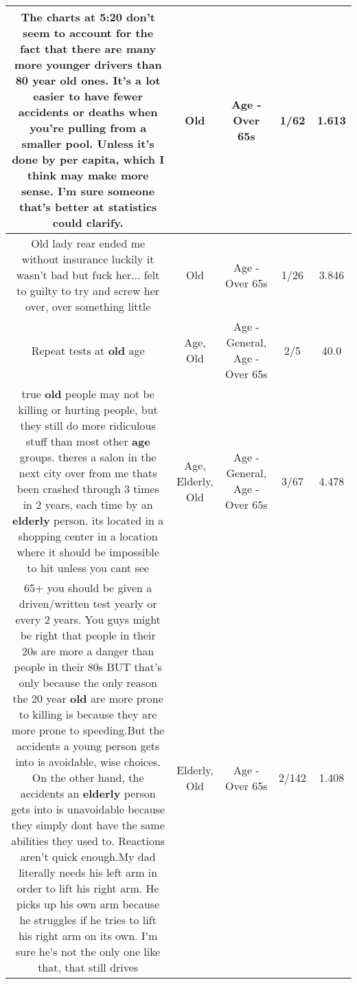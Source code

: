 \documentclass[11pt]{article}
\newlength\mylength
\begin{document}
\begin{center}
\begin{longtable}{|C{.65\mylength}|C{.30\mylength}|C{.12\mylength}|C{.12\mylength}|C{.12\mylength}|}
  \small The charts at 5:20 don't seem to account for the fact that there are many more younger drivers than 80 year \textbf{old} ones. It's a lot easier to have fewer accidents or deaths when you're pulling from a smaller pool. Unless it's done by per capita, which I think may make more sense. I'm sure someone that's better at statistics could clarify.\normalsize   & Old & Age - Over 65s & 1/62 & 1.613 \\  \hline
  \small Old lady rear ended me without insurance luckily it wasn't bad but fuck her... felt to guilty to try and screw her over, over something little\normalsize   & Old & Age - Over 65s & 1/26 & 3.846 \\  \hline
  \small Repeat tests at \textbf{old} age\normalsize   & Age, Old & Age - General, Age - Over 65s & 2/5 & 40.0 \\  \hline
  \small true \textbf{old} people may not be killing or hurting people, but they still do more ridiculous stuff than most other \textbf{age} groups. theres a salon in the next city over from me thats been crashed through 3 times in 2 years, each time by an \textbf{elderly} person. its located in a shopping center in a location where it should be impossible to hit unless you cant see\normalsize   & Age, Elderly, Old & Age - General, Age - Over 65s & 3/67 & 4.478 \\  \hline
  \small 65+ you should be given a driven/written test yearly or every 2 years. You guys might be right that people in their 20s are more a danger than people in their 80s BUT that's only because the only reason the 20 year \textbf{old} are more prone to killing is because they are more prone to speeding.But the accidents a young person gets into is avoidable, wise choices. On the other hand, the accidents an \textbf{elderly} person gets into is unavoidable because they simply dont have the same abilities they used to. Reactions aren't quick enough.My dad literally needs his left arm in order to lift his right arm. He picks up his own arm because he struggles if he tries to lift his right arm on its own. I'm sure he's not the only one like that, that still drives\normalsize   & Elderly, Old & Age - Over 65s & 2/142 & 1.408 \\  \hline

\end{longtable}
\end{center}
\end{document}
